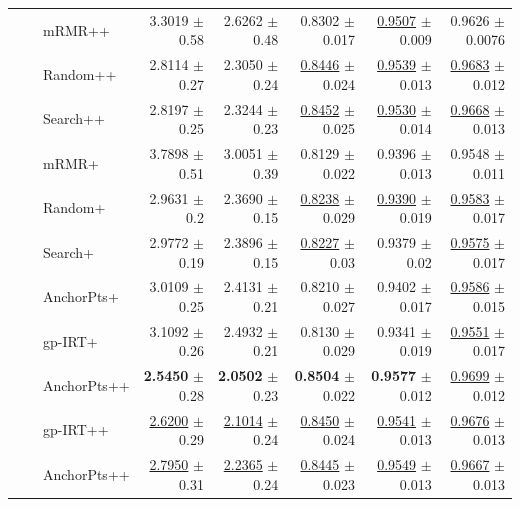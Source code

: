 \begin{longtable}{llp{}rrrrr}
 &  & mRMR++ & 3.3019 {\scriptsize $\pm$ 0.58} & 2.6262 {\scriptsize $\pm$ 0.48} & 0.8302 {\scriptsize $\pm$ 0.017} & \underline{0.9507} {\scriptsize $\pm$ 0.009} & 0.9626 {\scriptsize $\pm$ 0.0076} \\
 &  & Random++ & 2.8114 {\scriptsize $\pm$ 0.27} & 2.3050 {\scriptsize $\pm$ 0.24} & \underline{0.8446} {\scriptsize $\pm$ 0.024} & \underline{0.9539} {\scriptsize $\pm$ 0.013} & \underline{0.9683} {\scriptsize $\pm$ 0.012} \\
 &  & Search++ & 2.8197 {\scriptsize $\pm$ 0.25} & 2.3244 {\scriptsize $\pm$ 0.23} & \underline{0.8452} {\scriptsize $\pm$ 0.025} & \underline{0.9530} {\scriptsize $\pm$ 0.014} & \underline{0.9668} {\scriptsize $\pm$ 0.013} \\
 &  & mRMR+ & 3.7898 {\scriptsize $\pm$ 0.51} & 3.0051 {\scriptsize $\pm$ 0.39} & 0.8129 {\scriptsize $\pm$ 0.022} & 0.9396 {\scriptsize $\pm$ 0.013} & 0.9548 {\scriptsize $\pm$ 0.011} \\
 &  & Random+ & 2.9631 {\scriptsize $\pm$ 0.2} & 2.3690 {\scriptsize $\pm$ 0.15} & \underline{0.8238} {\scriptsize $\pm$ 0.029} & \underline{0.9390} {\scriptsize $\pm$ 0.019} & \underline{0.9583} {\scriptsize $\pm$ 0.017} \\
 &  & Search+ & 2.9772 {\scriptsize $\pm$ 0.19} & 2.3896 {\scriptsize $\pm$ 0.15} & \underline{0.8227} {\scriptsize $\pm$ 0.03} & 0.9379 {\scriptsize $\pm$ 0.02} & \underline{0.9575} {\scriptsize $\pm$ 0.017} \\
 &  & AnchorPts+ & 3.0109 {\scriptsize $\pm$ 0.25} & 2.4131 {\scriptsize $\pm$ 0.21} & 0.8210 {\scriptsize $\pm$ 0.027} & 0.9402 {\scriptsize $\pm$ 0.017} & \underline{0.9586} {\scriptsize $\pm$ 0.015} \\
 &  & gp-IRT+ & 3.1092 {\scriptsize $\pm$ 0.26} & 2.4932 {\scriptsize $\pm$ 0.21} & 0.8130 {\scriptsize $\pm$ 0.029} & 0.9341 {\scriptsize $\pm$ 0.019} & \underline{0.9551} {\scriptsize $\pm$ 0.017} \\
 &  & AnchorPts++ & \textbf{2.5450} {\scriptsize $\pm$ 0.28} & \textbf{2.0502} {\scriptsize $\pm$ 0.23} & \textbf{0.8504} {\scriptsize $\pm$ 0.022} & \textbf{0.9577} {\scriptsize $\pm$ 0.012} & \underline{0.9699} {\scriptsize $\pm$ 0.012} \\
 &  & gp-IRT++ & \underline{2.6200} {\scriptsize $\pm$ 0.29} & \underline{2.1014} {\scriptsize $\pm$ 0.24} & \underline{0.8450} {\scriptsize $\pm$ 0.024} & \underline{0.9541} {\scriptsize $\pm$ 0.013} & \underline{0.9676} {\scriptsize $\pm$ 0.013} \\
 &  & AnchorPts++ & \underline{2.7950} {\scriptsize $\pm$ 0.31} & \underline{2.2365} {\scriptsize $\pm$ 0.24} & \underline{0.8445} {\scriptsize $\pm$ 0.023} & \underline{0.9549} {\scriptsize $\pm$ 0.013} & \underline{0.9667} {\scriptsize $\pm$ 0.013} \\

\end{longtable}
